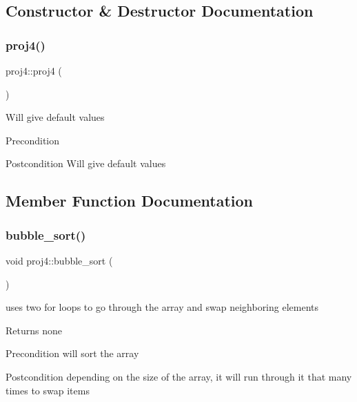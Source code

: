 \subsection{Constructor \& Destructor Documentation}
\mbox{\label{classproj4_ac880083cdde0f8b74520224be0d66085}} 
\subsubsection{\texorpdfstring{proj4()}{proj4()}}
{\footnotesize\ttfamily proj4\+::proj4 (\begin{DoxyParamCaption}{ }\end{DoxyParamCaption})}

Will give default values \begin{DoxyPrecond}{Precondition}

\end{DoxyPrecond}
\begin{DoxyPostcond}{Postcondition}
Will give default values 
\end{DoxyPostcond}


\subsection{Member Function Documentation}
\mbox{\label{classproj4_aee6e853c25f60b77413edf9d0cf19470}} 
\subsubsection{\texorpdfstring{bubble\+\_\+sort()}{bubble\_sort()}}
{\footnotesize\ttfamily void proj4\+::bubble\+\_\+sort (\begin{DoxyParamCaption}{ }\end{DoxyParamCaption})}



uses two for loops to go through the array and swap neighboring elements 

\begin{DoxyReturn}{Returns}
none 
\end{DoxyReturn}
\begin{DoxyPrecond}{Precondition}
will sort the array 
\end{DoxyPrecond}
\begin{DoxyPostcond}{Postcondition}
depending on the size of the array, it will run through it that many times to swap items 
\end{DoxyPostcond}
\mbox{\label{classproj4_a6a830cb16e2252128616906c345429dd}} 
